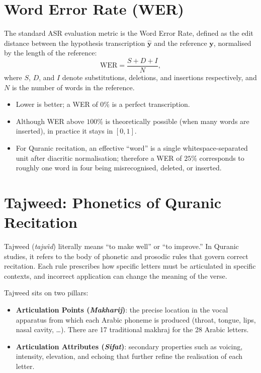 \documentclass[12pt,a4paper]{report}
\begin{document}
\section{Word Error Rate (WER)}
\label{sec:mt_wer}

The standard ASR evaluation metric is the Word Error Rate, defined as the
edit distance between the hypothesis transcription $\hat{\mathbf{y}}$ and
the reference $\mathbf{y}$, normalised by the length of the reference:
\begin{equation}
\label{eq:mt_wer}
\mathrm{WER} = \frac{S + D + I}{N},
\end{equation}
where $S$, $D$, and $I$ denote substitutions, deletions, and insertions
respectively, and $N$ is the number of words in the reference.

\begin{itemize}
  \item Lower is better; a WER of $0\%$ is a perfect transcription.
  \item Although WER above $100\%$ is theoretically possible (when many
        words are inserted), in practice it stays in $[0,1]$.
  \item For Quranic recitation, an effective ``word'' is a single
        whitespace-separated unit after diacritic normalisation; therefore
        a WER of $25\%$ corresponds to roughly one word in four being
        misrecognised, deleted, or inserted.
\end{itemize}

\section{Tajweed: Phonetics of Quranic Recitation}
\label{sec:mt_tajweed}

\begin{emeraldbox}[title=Tajweed]
Tajweed (\textit{tajw{\^\i}d}) literally means ``to make well'' or ``to
improve.'' In Quranic studies, it refers to the body of phonetic and
prosodic rules that govern correct recitation. Each rule prescribes how
specific letters must be articulated in specific contexts, and incorrect
application can change the meaning of the verse.
\end{emeraldbox}

Tajweed sits on two pillars:
\begin{itemize}
  \item \textbf{Articulation Points (\textit{Makharij})}: the precise
        location in the vocal apparatus from which each Arabic phoneme is
        produced (throat, tongue, lips, nasal cavity, \dots). There are
        17 traditional makhraj for the 28 Arabic letters.
  \item \textbf{Articulation Attributes (\textit{Sifat})}: secondary
        properties such as voicing, intensity, elevation, and
        echoing that further refine the realisation of each letter.
\end{itemize}
\end{document}
